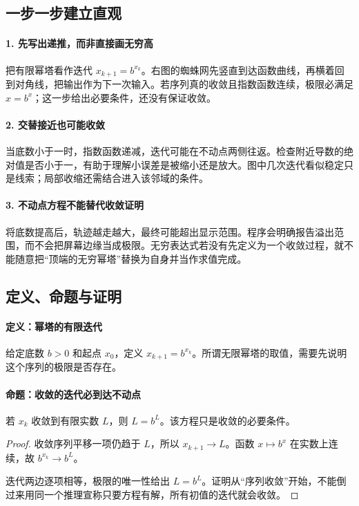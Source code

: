 \subsection*{一步一步建立直观}

\paragraph{1. 先写出递推，而非直接画无穷高}

把有限幂塔看作迭代 $x_{k+1}=b^{x_k}$。右图的蜘蛛网先竖直到达函数曲线，再横着回到对角线，把输出作为下一次输入。若序列真的收敛且指数函数连续，极限必满足 $x=b^x$；这一步给出必要条件，还没有保证收敛。



\paragraph{2. 交替接近也可能收敛}

当底数小于一时，指数函数递减，迭代可能在不动点两侧往返。检查附近导数的绝对值是否小于一，有助于理解小误差是被缩小还是放大。图中几次迭代看似稳定只是线索；局部收缩还需结合进入该邻域的条件。



\paragraph{3. 不动点方程不能替代收敛证明}

将底数提高后，轨迹越走越大，最终可能超出显示范围。程序会明确报告溢出范围，而不会把屏幕边缘当成极限。无穷表达式若没有先定义为一个收敛过程，就不能随意把“顶端的无穷幂塔”替换为自身并当作求值完成。



\subsection*{定义、命题与证明}

\paragraph{定义：幂塔的有限迭代}

给定底数 $b>0$ 和起点 $x_0$，定义 $x_{k+1}=b^{x_k}$。所谓无限幂塔的取值，需要先说明这个序列的极限是否存在。

\paragraph{命题：收敛的迭代必到达不动点}

若 $x_k$ 收敛到有限实数 $L$，则 $L=b^L$。该方程只是收敛的必要条件。

\begin{proof}

收敛序列平移一项仍趋于 $L$，所以 $x_{k+1}\to L$。函数 $x\mapsto b^x$ 在实数上连续，故 $b^{x_k}\to b^L$。

迭代两边逐项相等，极限的唯一性给出 $L=b^L$。证明从“序列收敛”开始，不能倒过来用同一个推理宣称只要方程有解，所有初值的迭代就会收敛。

\end{proof}
